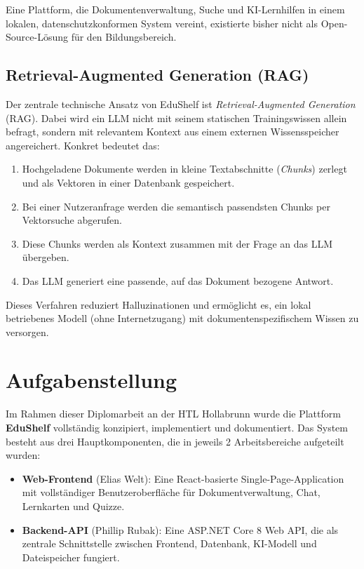 Eine Plattform, die Dokumentenverwaltung, Suche und KI-Lernhilfen in einem lokalen, datenschutzkonformen System vereint, existierte bisher nicht als Open-Source-Lösung für den Bildungsbereich.

\subsection{Retrieval-Augmented Generation (RAG)}

Der zentrale technische Ansatz von EduShelf ist \textit{Retrieval-Augmented Generation} (RAG). Dabei wird ein LLM nicht mit seinem statischen Trainingswissen allein befragt, sondern mit relevantem Kontext aus einem externen Wissensspeicher angereichert. Konkret bedeutet das:

\begin{enumerate}
    \item Hochgeladene Dokumente werden in kleine Textabschnitte (\textit{Chunks}) zerlegt und als Vektoren in einer Datenbank gespeichert.
    \item Bei einer Nutzeranfrage werden die semantisch passendsten Chunks per Vektorsuche abgerufen.
    \item Diese Chunks werden als Kontext zusammen mit der Frage an das LLM übergeben.
    \item Das LLM generiert eine passende, auf das Dokument bezogene Antwort.
\end{enumerate}

Dieses Verfahren reduziert Halluzinationen und ermöglicht es, ein lokal betriebenes Modell (ohne Internetzugang) mit dokumentenspezifischem Wissen zu versorgen.

\section{Aufgabenstellung}

Im Rahmen dieser Diplomarbeit an der HTL Hollabrunn wurde die Plattform \textbf{EduShelf} vollständig konzipiert, implementiert und dokumentiert. Das System besteht aus drei Hauptkomponenten, die in jeweils 2 Arbeitsbereiche aufgeteilt wurden:

\begin{itemize}
    \item \textbf{Web-Frontend} (Elias Welt): Eine React-basierte Single-Page-Application mit vollständiger Benutzeroberfläche für Dokumentverwaltung, Chat, Lernkarten und Quizze.
    \item \textbf{Backend-API} (Phillip Rubak): Eine ASP.NET Core 8 Web API, die als zentrale Schnittstelle zwischen Frontend, Datenbank, KI-Modell und Dateispeicher fungiert.
\end{itemize}

